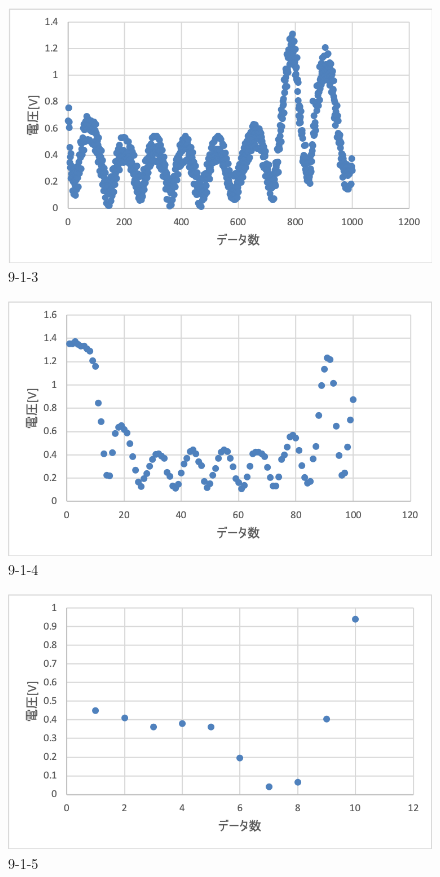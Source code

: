 \documentclass[11pt, a4paper,twocolumn]{jarticle}
\begin{document}
\begin{figure}[ht]
 \begin{center}
  \includegraphics[width=0.8\linewidth]{fig13.png}
 \end{center}
 \caption{9-1-3}
 \label{fig:13}
\end{figure}

\begin{figure}[ht]
 \begin{center}
  \includegraphics[width=0.8\linewidth]{fig14.png}
 \end{center}
 \caption{9-1-4}
 \label{fig:14}
\end{figure}

\begin{figure}[ht]
 \begin{center}
  \includegraphics[width=0.8\linewidth]{fig15.png}
 \end{center}
 \caption{9-1-5}
 \label{fig:15}
\end{figure}
\end{document}
